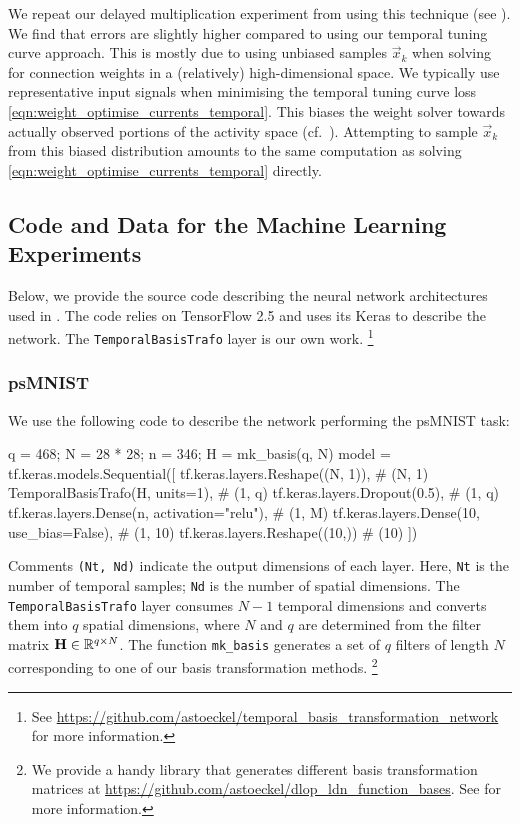 We repeat our delayed multiplication experiment from  using this technique (see ).
We find that errors are slightly higher compared to using our temporal tuning curve approach.
This is mostly due to using unbiased samples $\vec x_k$ when solving for connection weights in a (relatively) high-dimensional space.
We typically use representative input signals when minimising the temporal tuning curve loss \cref{eqn:weight_optimise_currents_temporal}.
This biases the weight solver towards actually observed portions of the activity space (cf.~).
Attempting to sample $\vec x_k$ from this biased distribution amounts to the same computation as solving \cref{eqn:weight_optimise_currents_temporal} directly.

\subsection{Code and Data for the Machine Learning Experiments}
\label{app:lmu_code}

Below, we provide the source code describing the neural network architectures used in .
The code relies on TensorFlow 2.5 \citep{abadi2016tensorflow} and uses its Keras \API \citep{chollet2017deep} to describe the network.
The \texttt{TemporalBasisTrafo} layer is our own work.%
\footnote{See \url{https://github.com/astoeckel/temporal_basis_transformation_network} for more information.}

\subsubsection{psMNIST}

We use the following code to describe the network performing the psMNIST task:
\begin{pythoncode}
q = 468; N = 28 * 28; n = 346; H = mk_basis(q, N)
model = tf.keras.models.Sequential([
  tf.keras.layers.Reshape((N, 1)),             # (N, 1)
  TemporalBasisTrafo(H, units=1),              # (1, q)
  tf.keras.layers.Dropout(0.5),                # (1, q)
  tf.keras.layers.Dense(n, activation="relu"), # (1, M)
  tf.keras.layers.Dense(10, use_bias=False),   # (1, 10)
  tf.keras.layers.Reshape((10,))               # (10)
])
\end{pythoncode}
Comments \texttt{(Nt, Nd)} indicate the output dimensions of each layer.
Here, \texttt{Nt} is the number of temporal samples; \texttt{Nd} is the number of spatial dimensions.
The \texttt{TemporalBasisTrafo} layer consumes $N - 1$ temporal dimensions and converts them into $q$ spatial dimensions, where $N$ and $q$ are determined from the filter matrix $\mathbf{H} \in \mathbb{R}^{q \times N}$.
The function \texttt{mk\_basis} generates a set of $q$ \FIR filters of length $N$ corresponding to one of our basis transformation methods.%
\footnote{We provide a handy library that generates different basis transformation matrices at \url{https://github.com/astoeckel/dlop_ldn_function_bases}. See \citet{stockel2021discrete} for more information.}

